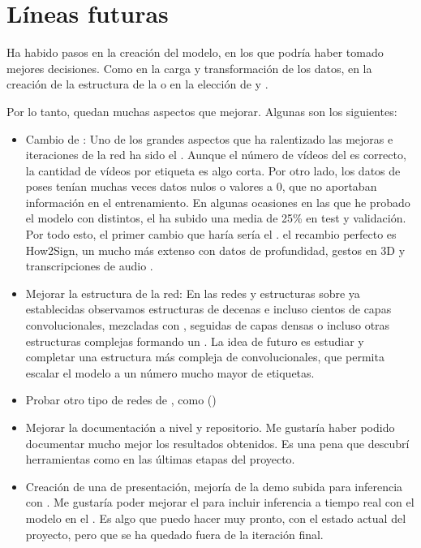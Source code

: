 \section{Líneas futuras}

Ha habido pasos en la creación del modelo, en los que podría haber tomado mejores decisiones. Como en la carga y transformación de los datos, en la creación de la estructura de la  o en la elección de  y .

Por lo tanto, quedan muchas aspectos que mejorar. Algunas son los siguientes:

\begin{itemize}
  \item Cambio de : Uno de los grandes aspectos que ha ralentizado las mejoras e iteraciones de la red ha sido el . Aunque el número de vídeos del  es correcto, la cantidad de vídeos por etiqueta es algo corta. Por otro lado, los datos de poses tenían muchas veces datos nulos o valores a 0, que no aportaban información en el entrenamiento. En algunas ocasiones en las que he probado el modelo con  distintos, el  ha subido una media de 25\% en test y validación. Por todo esto, el primer cambio que haría sería el . el recambio perfecto es How2Sign, un  mucho más extenso con datos de profundidad, gestos en 3D y transcripciones de audio .

  \item Mejorar la estructura de la red: En las redes y estructuras sobre  ya establecidas observamos estructuras de decenas e incluso cientos de capas convolucionales, mezcladas con , seguidas de capas densas o incluso otras estructuras complejas formando un . La idea de futuro es estudiar y completar una estructura más compleja de convolucionales, que permita escalar el modelo a un número mucho mayor de etiquetas.

  \item Probar otro tipo de redes de , como  ()

  \item Mejorar la documentación a nivel  y repositorio. Me gustaría haber podido documentar mucho mejor los resultados obtenidos. Es una pena que descubrí herramientas como  en las últimas etapas del proyecto.

  \item Creación de una  de presentación, mejoría de la demo subida para inferencia con . Me gustaría poder mejorar el  para incluir inferencia a tiempo real con el modelo en el . Es algo que puedo hacer muy pronto, con el estado actual del proyecto, pero que se ha quedado fuera de la iteración final.


\end{itemize}
